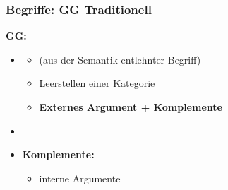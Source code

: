 \begin{frame}
\frametitle{Begriffe: GG \vs Traditionell}

\begin{minipage}[b]{0.47\textwidth}

	\textbf{GG:}

	\begin{itemize}
		\item {}
		\begin{itemize}
			\item (aus der Semantik entlehnter Begriff)
			
			\item Leerstellen einer Kategorie 
			
			\item \textbf{Externes Argument + Komplemente}
		\end{itemize}

		\item[]

		\item \textbf{Komplemente:}
		\begin{itemize}
			\item interne Argumente
		\end{itemize}

	\end{itemize}	
\end{minipage}  
\begin{minipage}[b]{0.5\textwidth}
	\begin{figure}
	\centering
	\end{figure}
\end{minipage}

\end{frame}


